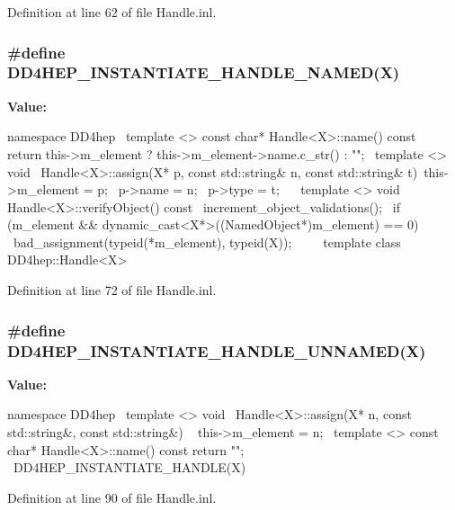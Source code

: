 Definition at line 62 of file Handle.inl.\hypertarget{_handle_8inl_a9da33fd2046c253711abd9194ce5265a}{
\subsubsection[{DD4HEP\_\-INSTANTIATE\_\-HANDLE\_\-NAMED}]{\setlength{\rightskip}{0pt plus 5cm}\#define DD4HEP\_\-INSTANTIATE\_\-HANDLE\_\-NAMED(X)}}
\label{_handle_8inl_a9da33fd2046c253711abd9194ce5265a}
{\bfseries Value:}
\begin{DoxyCode}
namespace DD4hep {                                                    \
    template <> const char* Handle<X>::name() const                     \
    { return this->m_element ? this->m_element->name.c_str() : ""; }    \
    template <> void                                                    \
    Handle<X>::assign(X* p, const std::string& n, const std::string& t){\
      this->m_element = p;                                              \
      p->name = n;                                                      \
      p->type = t;                                                      \
    }                                                                   \
    template <> void Handle<X>::verifyObject() const    {               \
      increment_object_validations();                                   \
      if (m_element && dynamic_cast<X*>((NamedObject*)m_element) == 0) {\
        bad_assignment(typeid(*m_element), typeid(X));                  \
      }                                                                 \
    }}                                                                  \
  template class DD4hep::Handle<X>
\end{DoxyCode}


Definition at line 72 of file Handle.inl.\hypertarget{_handle_8inl_ad861f1cd8d1e45907d1e481780fa99d2}{
\subsubsection[{DD4HEP\_\-INSTANTIATE\_\-HANDLE\_\-UNNAMED}]{\setlength{\rightskip}{0pt plus 5cm}\#define DD4HEP\_\-INSTANTIATE\_\-HANDLE\_\-UNNAMED(X)}}
\label{_handle_8inl_ad861f1cd8d1e45907d1e481780fa99d2}
{\bfseries Value:}
\begin{DoxyCode}
namespace DD4hep {                                                    \
    template <> void                                                    \
    Handle<X>::assign(X* n, const std::string&, const std::string&)     \
    { this->m_element = n;}                                             \
    template <> const char* Handle<X>::name() const { return ""; }      \
  }                                                                     \
  DD4HEP_INSTANTIATE_HANDLE(X)
\end{DoxyCode}


Definition at line 90 of file Handle.inl.